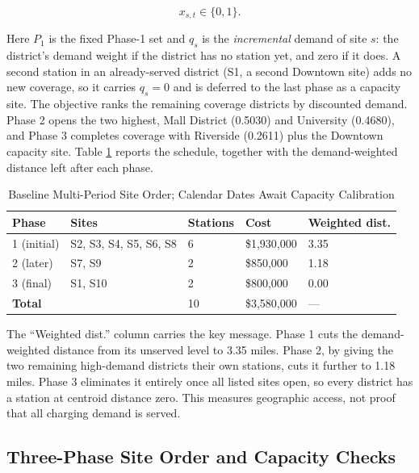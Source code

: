 \documentclass[12pt]{article}
\begin{document}
\begin{equation}
x_{s,t} \in \{0,1\}.
\end{equation}

Here $P_1$ is the fixed Phase-1 set and $q_s$ is the \emph{incremental} demand of site
$s$: the district's demand weight if the district has no station yet, and zero if it does.
A second station in an already-served district (S1, a second Downtown site) adds no new
coverage, so it carries $q_s = 0$ and is deferred to the last phase as a capacity site. The
objective ranks the remaining coverage districts by discounted demand. Phase 2
opens the two highest, Mall District (0.5030) and University (0.4680), and Phase 3
completes coverage with Riverside (0.2611) plus the Downtown capacity site. Table
\ref{tab:multiperiod} reports the schedule, together with the demand-weighted distance left
after each phase.

\begin{table}[H]
\centering
\caption{Baseline Multi-Period Site Order; Calendar Dates Await Capacity Calibration}
\label{tab:multiperiod}
\renewcommand{\arraystretch}{0.95}
\begin{tabular}{@{}p{}p{}p{}p{}p{}@{}}
\toprule
Phase & Sites & Stations & Cost & Weighted dist. \\
\midrule
1 (initial) & S2, S3, S4, S5, S6, S8 & 6 & \$1,930,000 & 3.35 \\
2 (later) & S7, S9 & 2 & \$850,000 & 1.18 \\
3 (final) & S1, S10 & 2 & \$800,000 & 0.00 \\
\midrule
\multicolumn{2}{l}{\textbf{Total}} & 10 & \$3,580,000 & --- \\
\bottomrule
\end{tabular}
\end{table}

The ``Weighted dist.'' column carries the key message. Phase 1 cuts the demand-weighted
distance from its unserved level to 3.35 miles. Phase 2, by giving the two remaining
high-demand districts their own stations, cuts it further to 1.18 miles. Phase 3 eliminates
it entirely once all listed sites open, so every district has a station at centroid
distance zero. This measures geographic access, not proof that all charging demand is served.

\subsection{Three-Phase Site Order and Capacity Checks}
\end{document}
